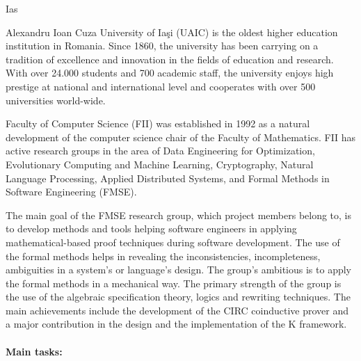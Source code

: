 \begin{sitedescription}{Ias}



Alexandru Ioan Cuza University of Iaşi  (UAIC) is the oldest higher education institution in Romania. 
Since 1860, the university has been carrying on a tradition of excellence and innovation in 
the fields of education and research. With over 24.000 students and 700 academic staff, 
the university enjoys high prestige at national and international level and cooperates with  
over 500 universities world-wide. 

Faculty of Computer Science (FII) was established in 1992 as a natural development of the computer 
science chair of the Faculty of Mathematics. FII has active research groups in the area of 
Data Engineering for Optimization, Evolutionary Computing and Machine Learning, Cryptography,
Natural Language Processing, Applied Distributed Systems, and Formal Methods in Software Engineering (FMSE).

The main goal of the FMSE research group, which project members belong to, is to develop methods and tools helping software
engineers in applying mathematical-based proof techniques during software development.
The use of the formal methods helps in revealing the inconsistencies, incompleteness,
ambiguities in a system's or language's design. The group’s ambitious is to apply the formal
methods in a mechanical way. The primary strength of the group is the use of the algebraic
specification theory, logics and rewriting techniques. The main achievements include the
development of the CIRC coinductive prover and a major contribution in the design and the
implementation of the K framework.

\paragraph*{Main tasks:}


\end{sitedescription}
